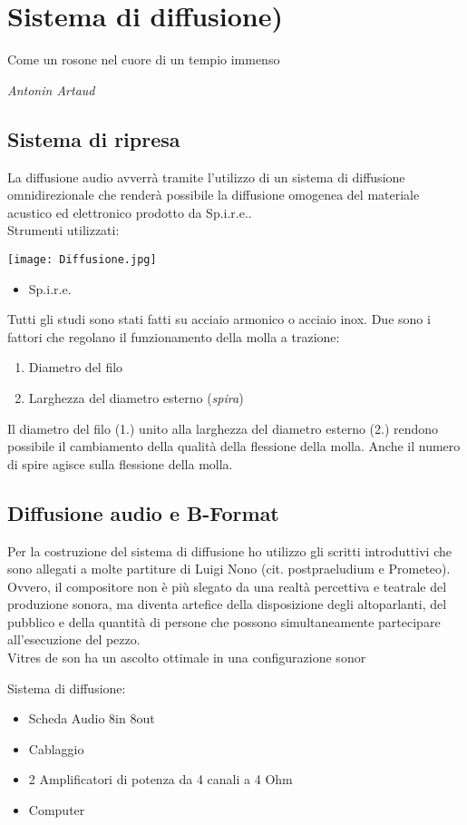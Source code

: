 
\chapter{Sistema di diffusione)}
\label{chp:Sistema di diffusione}

\epigraph{Come un rosone nel cuore di un tempio immenso}{\textit{Antonin Artaud}}

\section{Sistema di ripresa}
La diffusione audio avverrà tramite l'utilizzo di un sistema di diffusione omnidirezionale che renderà possibile la diffusione omogenea del materiale acustico ed elettronico prodotto da Sp.i.r.e.. \\
Strumenti utilizzati:
\begin{center}
\begin{minipage}[c]{1.\textwidth}
\texttt{[image: Diffusione.jpg]}
\end{minipage}
\end{center}
\begin{itemize}
	\item{Sp.i.r.e.}
\end{itemize}

Tutti gli studi sono stati fatti su acciaio armonico o acciaio inox. Due sono i fattori che regolano il funzionamento della molla a trazione:
\begin{enumerate}
\item{Diametro del filo}
\item{Larghezza del diametro esterno (\textit{spira})}
\end{enumerate}
Il diametro del filo (1.) unito alla larghezza del diametro esterno (2.) rendono possibile il cambiamento della qualità della flessione della molla. Anche il numero di spire agisce sulla flessione della molla.

\section{Diffusione audio e B-Format}

Per la costruzione del sistema di diffusione ho utilizzo gli scritti introduttivi che sono allegati a molte partiture di Luigi Nono (cit. postpraeludium e Prometeo). Ovvero, il compositore non è più slegato da una realtà percettiva e teatrale del produzione sonora, ma diventa artefice della disposizione degli altoparlanti, del pubblico e della quantità di persone che possono simultaneamente partecipare all'esecuzione del pezzo. \\
Vitres de son ha un ascolto ottimale in una configurazione sonor

Sistema di diffusione:
\begin{itemize}
	\item{Scheda Audio 8in 8out}
	\item{Cablaggio}
	\item{2 Amplificatori di potenza da 4 canali a 4 Ohm}
	\item{Computer}
\end{itemize}



